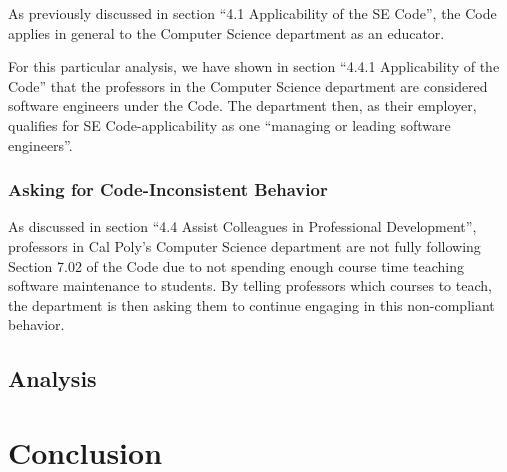 \documentclass[11pt]{article}
\begin{document}
\begin{multicols}{2}
As previously discussed in section ``4.1 Applicability of the SE Code'', the Code applies in general to the Computer Science department as an educator.

For this particular analysis, we have shown in section ``4.4.1 Applicability of the Code'' that the professors in the Computer Science department are considered software engineers under the Code.  The department then, as their employer, qualifies for SE Code-applicability as one ``managing or leading software engineers''. \cite{secode}

\subsubsection{Asking for Code-Inconsistent Behavior}

As discussed in section ``4.4 Assist Colleagues in Professional Development'', professors in Cal Poly's Computer Science department are not fully following Section 7.02 of the Code due to not spending enough course time teaching software maintenance to students.  By telling professors which courses to teach, the department is then asking them to continue engaging in this non-compliant behavior.

\subsection{Analysis}


\section{Conclusion}

\end{multicols}
\newpage

\nocite{*}




\end{document}
